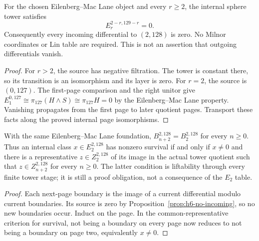 \begin{proposition}
  \label{prop:h6-no-incoming}
  \leanok
  For the chosen Eilenberg--Mac Lane object and every $r\ge2$, the internal sphere tower satisfies
  \[
    E_r^{2-r,129-r}=0.
  \]
  Consequently every incoming differential to $(2,128)$ is zero.
  No Milnor coordinates or Lin table are required. This is not an assertion
  that outgoing differentials vanish.
\end{proposition}
\begin{proof}
  For $r>2$, the source has negative filtration. The tower is constant there,
  so its transition is an isomorphism and its layer is zero. For $r=2$,
  the source is $(0,127)$. The first-page comparison and the right unitor give
  $E_1^{0,127}\cong\pi_{127}(H\wedge S)\cong\pi_{127}H=0$ by the
  Eilenberg--Mac Lane property. Vanishing propagates from the
  first page to later quotient pages. Transport these facts along the proved
  internal page isomorphisms.
  \leanok
\end{proof}

\begin{proposition}
  \label{prop:h6-survival-liftability}
  \leanok
  With the same Eilenberg--Mac Lane foundation, $B_{n+2}^{2,128}=B_2^{2,128}$ for every
  $n\ge0$. Thus an internal class $x\in E_2^{2,128}$ has nonzero survival
  if and only if $x\ne0$ and there is a representative $z\in Z_2^{2,128}$
  of its image in the actual tower quotient such that
  $z\in Z_{n+2}^{2,128}$ for every $n\ge0$.
  The latter condition is liftability through every finite tower stage;
  it is still a proof obligation, not a consequence of the $E_2$ table.
\end{proposition}
\begin{proof}
  Each next-page boundary is the image of a current differential modulo
  current boundaries. Its source is zero by Proposition~\ref{prop:h6-no-incoming},
  so no new boundaries occur. Induct on the page. In the common-representative
  criterion for survival, not being a boundary on every page now reduces to
  not being a boundary on page two, equivalently $x\ne0$.
  \leanok
\end{proof}


